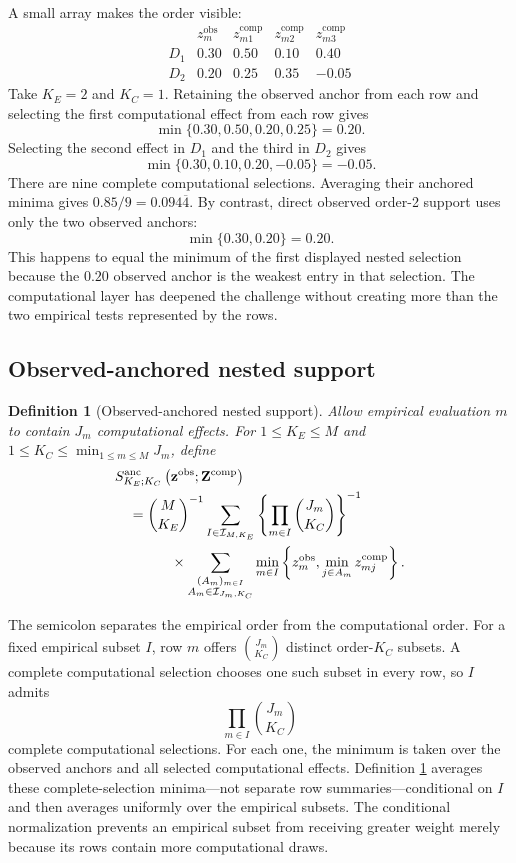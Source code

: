 \documentclass[11pt]{article}
\newcommand{\Sanc}{S^{\mathrm{anc}}}
\newtheorem{definition}{Definition}
\theoremstyle{remark}
\begin{document}
A small array makes the order visible:
\[
\begin{array}{c|c|ccc}
&z_m^{\mathrm{obs}}&z_{m1}^{\mathrm{comp}}&z_{m2}^{\mathrm{comp}}&z_{m3}^{\mathrm{comp}}\\
\hline
D_1&0.30&0.50&0.10&0.40\\
D_2&0.20&0.25&0.35&-0.05
\end{array}
\]
Take $K_E=2$ and $K_C=1$. Retaining the observed anchor from each row and
selecting the first computational effect from each row gives
\[
\min\{0.30,0.50,0.20,0.25\}=0.20.
\]
Selecting the second effect in $D_1$ and the third in $D_2$ gives
\[
\min\{0.30,0.10,0.20,-0.05\}=-0.05.
\]
There are nine complete computational selections. Averaging their anchored
minima gives $0.85/9=0.094\overline4$. By contrast, direct observed order-2
support uses only the two observed anchors:
\[
\min\{0.30,0.20\}=0.20.
\]
This happens to equal the minimum of the first displayed nested selection
because the $0.20$ observed anchor is the weakest entry in that selection. The
computational layer has deepened the challenge without creating more than the
two empirical tests represented by the rows.

\subsection{Observed-anchored nested support}

\begin{definition}[Observed-anchored nested support]
\label{def:anchored-support}
Allow empirical evaluation $m$ to contain $J_m$ computational effects. For
$1\leq K_E\leq M$ and
$1\leq K_C\leq\min_{1\leq m\leq M}J_m$, define
\begin{align}
&\Sanc_{K_E;K_C}
\left(\mathbf z^{\mathrm{obs}};\mathbf Z^{\mathrm{comp}}\right)
\notag\\
&\quad=
\binom{M}{K_E}^{-1}
\sum_{I\in\mathcal I_{M,K_E}}
\left\{
\prod_{m\in I}\binom{J_m}{K_C}
\right\}^{-1}
\notag\\
&\qquad\qquad\times
\sum_{\substack{
(A_m)_{m\in I}\\
A_m\in\mathcal I_{J_m,K_C}}}
\min_{m\in I}
\left\{
z_m^{\mathrm{obs}},
\min_{j\in A_m}z_{mj}^{\mathrm{comp}}
\right\}.
\label{eq:anchored-support}
\end{align}
\end{definition}

The semicolon separates the empirical order from the computational order. For
a fixed empirical subset $I$, row $m$ offers $\binom{J_m}{K_C}$ distinct
order-$K_C$ subsets. A complete computational selection chooses one such
subset in every row, so $I$ admits
\[
\prod_{m\in I}\binom{J_m}{K_C}
\]
complete computational selections. For each one, the minimum is taken over
the observed anchors and all selected computational effects. Definition
\ref{def:anchored-support} averages these complete-selection minima---not
separate row summaries---conditional on $I$ and then averages uniformly over
the empirical subsets. The conditional normalization prevents an empirical
subset from receiving greater weight merely because its rows contain more
computational draws.
\end{document}
